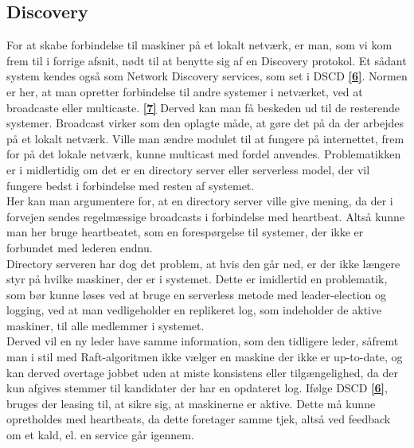 \documentclass[a4paper,12pt]{article}
\begin{document}
\subsection{Discovery}
For at skabe forbindelse til maskiner på et lokalt netværk, er man, som vi kom frem til i forrige afsnit, nødt til at benytte sig af en Discovery protokol. Et sådant system kendes også som Network Discovery services, som set i DSCD \hyperref[seks]{\textbf{[6]}}. Normen er her, at man opretter forbindelse til andre systemer i netværket, ved at broadcaste eller multicaste. \hyperref[syv]{\textbf{[7]}} Derved kan man få beskeden ud til de resterende systemer. Broadcast virker som den oplagte måde, at gøre det på da der arbejdes på et lokalt netværk.
Ville man ændre modulet til at fungere på internettet, frem for på det lokale netværk, kunne multicast med fordel anvendes.
Problematikken er i midlertidig om det er en directory server eller serverless model, der vil fungere bedst i forbindelse med resten af systemet.
\\[5px]
Her kan man argumentere for, at en directory server ville give mening, da der i forvejen sendes regelmæssige broadcasts i forbindelse med heartbeat. Altså kunne man her bruge heartbeatet, som en forespørgelse til systemer, der ikke er forbundet med lederen endnu.
\\
Directory serveren har dog det problem, at hvis den går ned, er der ikke længere styr på hvilke maskiner, der er i systemet. Dette er imidlertid en problematik, som bør kunne løses ved at bruge en serverless metode med leader-election og logging, ved at man vedligeholder en replikeret log, som indeholder de aktive maskiner, til alle medlemmer i systemet. 
\\
Derved vil en ny leder have samme information, som den tidligere leder, såfremt man i stil med Raft-algoritmen ikke vælger en maskine der ikke er up-to-date, og kan derved overtage jobbet uden at miste konsistens eller tilgængelighed, da der kun afgives stemmer til kandidater der har en opdateret log. Ifølge DSCD \hyperref[seks]{\textbf{[6]}}, bruges der leasing til, at sikre sig, at maskinerne er aktive. Dette må kunne opretholdes med heartbeats, da dette foretager samme tjek, altså ved feedback om et kald, el. en service går igennem.
\end{document}
